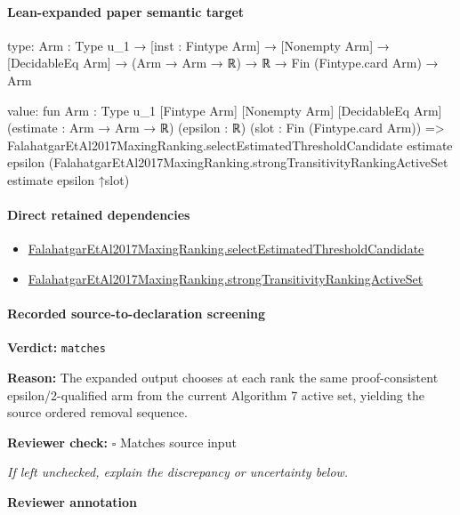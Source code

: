 \documentclass[10pt]{article}
\newcommand{\reviewerbox}{%
  \par\noindent\fbox{\parbox{0.96\linewidth}{\rule{0pt}{0.38in}}}\par
}
\newcommand{\reviewmatch}[1]{%
  \par\noindent\textbf{Reviewer check:} $\square$\; #1\par
  \noindent\emph{If left unchecked, explain the discrepancy or uncertainty below.}\par
}
\begin{document}
\paragraph{Lean-expanded paper semantic target}
\begin{ReviewVerbatim}
type:
{Arm : Type u_1} →
  [inst : Fintype Arm] → [Nonempty Arm] → [DecidableEq Arm] → (Arm → Arm → ℝ) → ℝ → Fin (Fintype.card Arm) → Arm

value:
fun {Arm : Type u_1} [Fintype Arm] [Nonempty Arm] [DecidableEq Arm] (estimate : Arm → Arm → ℝ) (epsilon : ℝ)
    (slot : Fin (Fintype.card Arm)) =>
  FalahatgarEtAl2017MaxingRanking.selectEstimatedThresholdCandidate estimate epsilon
    (FalahatgarEtAl2017MaxingRanking.strongTransitivityRankingActiveSet estimate epsilon ↑slot)
\end{ReviewVerbatim}

\paragraph{Direct retained dependencies}
\begin{itemize}\raggedright
\item \hyperlink{governing-declaration-4bccb08508a7c514}{Falahatgar\allowbreak{}Et\allowbreak{}Al2017\allowbreak{}Maxing\allowbreak{}Ranking.\allowbreak{}select\allowbreak{}Estimated\allowbreak{}Threshold\allowbreak{}Candidate}
\item \hyperlink{governing-declaration-fddb2e33088958e4}{Falahatgar\allowbreak{}Et\allowbreak{}Al2017\allowbreak{}Maxing\allowbreak{}Ranking.\allowbreak{}strong\allowbreak{}Transitivity\allowbreak{}Ranking\allowbreak{}Active\allowbreak{}Set}
\end{itemize}
\paragraph{Recorded source-to-declaration screening}
\textbf{Verdict:} \texttt{matches}
\\
{\raggedright
\textbf{Reason:} The expanded output chooses at each rank the same proof-\allowbreak{}consistent epsilon/\allowbreak{}2-\allowbreak{}qualified arm from the current Algorithm 7 active set, yielding the source ordered removal sequence.\allowbreak{}
\par}
\reviewmatch{Matches source input}
\noindent\textbf{Reviewer annotation}\par
\reviewerbox

\clearpage
\hypertarget{source-claim-f20726495e571206}{}
\hypertarget{source-section-f10b5f68e4acf3dc}{}
\end{document}
